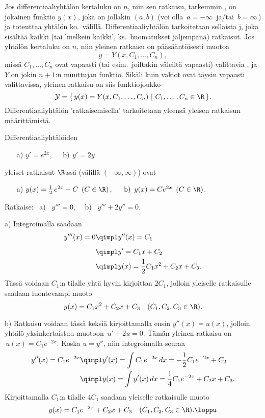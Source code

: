 Jos differentiaaliyhtälön kertaluku on $n$, niin sen ratkaisu, tarkemmin 
, on jokainen funktio $y(x)$, joka on jollakin 
 $(a,b)$ (voi olla $\,a=-\infty\,$ ja/tai $\,b=\infty\,$)    ja 
toteuttaa yhtälön ko.\ välillä. Differentiaaliyhtälön  tarkoitetaan
sellaista j, joka sisältää kaikki (tai 'melkein kaikki', ks.\
huomatukset jäljempänä) ratkaisut. Jos yhtälön kertaluku on $n$, niin yleinen ratkaisu on
pääsääntöisesti muotoa
\[
y=Y(x,C_1,\ldots,C_n),
\]
missä $C_1,\ldots,C_n$ ovat vapaasti (tai esim.\ joiltakin väleiltä vapaasti) valittavia 
\kor{vakioita}, ja $Y$ on jokin $n+1$:n muuttujan funktio. Sikäli kuin vakiot ovat täysin
vapaasti valittavissa, yleinen ratkaisu on siis funktiojoukko
\[
\mathcal{Y}=\{\,y(x)=Y(x,C_1,\ldots,C_n) \ | \ C_1,\ldots,C_n\in\R\,\}.
\]
Differentiaaliyhtälön 'ratkaisemisella' tarkoitetaan yleensä yleisen ratkaisun määrittämistä. 
\begin{Exa}
Differentiaaliyhtälöiden
\begin{itemize}
\item[a)] $y'=e^{2x}$, $\quad\ \text{b)}\,\ y'=2y$
\end{itemize}
yleiset ratkaisut $\R$:ssä (välillä $(-\infty,\infty)$) ovat
\begin{itemize}
\item[a)] $y(x)=\frac{1}{2}\,e^{2x}+C\,\ (C\in\R)$,
          $\quad\ \text{b)}\,\ y(x)=Ce^{2x}\,\ (C\in\R)$. \loppu
\end{itemize}
\end{Exa}

\begin{Exa} Ratkaise: \ a) \ $y'''=0$, \ \ b) \ $y'''+2y''=0$.
\end{Exa}
\ratk a) Integroimalla saadaan
\begin{align*} y'''(x) = 0 &\qimpl y''(x) = C_1 \\[2mm]
                           &\qimpl y' = C_1 x + C_2 \\
                           &\qimpl y(x) = \frac{1}{2}C_1 x^2 + C_2 x + C_3.
\end{align*}
Tässä voidaan $C_1$:n tilalle yhtä hyvin kirjoittaa $2C_1$, jolloin yleiselle ratkaisulle 
saadaan luontevampi muoto
\[ 
y(x) = C_1 x^2 + C_2 x + C_3 \quad (C_1,C_2,C_3 \in \R). 
\]

b) Ratkaisu voidaan tässä keksiä kirjoittamalla ensin $y''(x)=u(x)$, jolloin yhtälö 
yksinkertaistuu muotoon $\,u'+2u=0$. Tämän yleinen ratkaisu on $\,u(x)=C_1e^{-2x}$. Koska 
$u=y''$, niin integroimalla seuraa
\begin{align*}
y''(x) = C_1 e^{-2x} &\qimpl y'(x)=\int C_1 e^{-2x}\,dx=-\frac{1}{2}C_1e^{-2x}+C_2 \\
                     &\qimpl y(x)=\int y'(x)\,dx=\frac{1}{4}C_1e^{-2x}+C_2x+C_3.
\end{align*}
Kirjoittamalla $C_1$:n tilalle $4C_1$ saadaan yleiselle ratkaisulle muoto
\[
y(x)=C_1e^{-2x}+C_2x+C_3 \quad (C_1,C_2,C_3 \in \R). \loppu
\]

